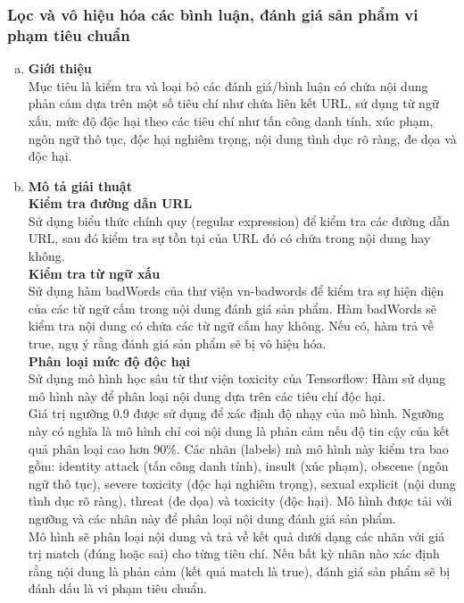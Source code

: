 \subsubsection{Lọc và vô hiệu hóa các bình luận, đánh giá sản phẩm vi phạm tiêu chuẩn}
\begin{enumerate}[a.]
\item \textbf{Giới thiệu}\\
Mục tiêu là kiểm tra và loại bỏ các đánh giá/bình luận có chứa nội dung phản cảm dựa trên một số tiêu chí như chứa liên kết URL, sử dụng từ ngữ xấu, mức độ độc hại theo các tiêu chí như tấn công danh tính, xúc phạm, ngôn ngữ thô tục, độc hại nghiêm trọng, nội dung tình dục rõ ràng, đe dọa và độc hại.

\item \textbf{Mô tả giải thuật}\\
\textbf{Kiểm tra đường dẫn URL} \\
Sử dụng biểu thức chính quy (regular expression) để kiểm tra các đường dẫn URL, sau đó kiểm tra sự tồn tại của URL đó có chứa trong nội dung hay không. \\
\textbf{Kiểm tra từ ngữ xấu}\\
Sử dụng hàm badWords của thư viện vn-badwords để kiểm tra sự hiện diện của các từ ngữ cấm trong nội dung đánh giá sản phẩm. Hàm badWords sẽ kiểm tra nội dung có chứa các từ ngữ cấm hay không. Nếu có, hàm trả về true, ngụ ý rằng đánh giá sản phẩm sẽ bị vô hiệu hóa.\\
\textbf{Phân loại mức độ độc hại}\\
Sử dụng mô hình học sâu từ thư viện toxicity của Tensorflow: Hàm sử dụng mô hình này để phân loại nội dung dựa trên các tiêu chí độc hại. \\
Giá trị ngưỡng 0.9 được sử dụng để xác định độ nhạy của mô hình. Ngưỡng này có nghĩa là mô hình chỉ coi nội dung là phản cảm nếu độ tin cậy của kết quả phân loại cao hơn 90\%. Các nhãn (labels) mà mô hình này kiểm tra bao gồm: identity attack (tấn công danh tính), insult (xúc phạm), obscene (ngôn ngữ thô tục), severe toxicity (độc hại nghiêm trọng), sexual explicit (nội dung tình dục rõ ràng), threat (đe dọa) và toxicity (độc hại). Mô hình được tải với ngưỡng và các nhãn này để phân loại nội dung đánh giá sản phẩm.\\
Mô hình sẽ phân loại nội dung và trả về kết quả dưới dạng các nhãn với giá trị match (đúng hoặc sai) cho từng tiêu chí. Nếu bất kỳ nhãn nào xác định rằng nội dung là phản cảm (kết quả match là true), đánh giá sản phẩm sẽ bị đánh dấu là vi phạm tiêu chuẩn.
\end{enumerate}

